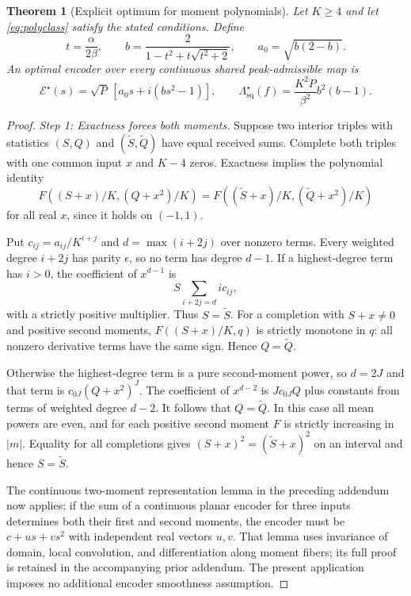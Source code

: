 \documentclass[11pt,letterpaper]{article}
\newtheorem{theorem}{Theorem}
\theoremstyle{remark}
\newcommand{\enc}{\mathscr E}
\newcommand{\sq}{\mathrm{sq}}
\begin{document}
\begin{theorem}[Explicit optimum for moment polynomials]
\label{thm:polynomial}
Let $K\ge4$ and let \eqref{eq:polyclass} satisfy the stated conditions. Define
$$
 t=\frac{\alpha}{2\beta},\qquad
 b=\frac{2}{1-t^2+t\sqrt{t^2+2}},\qquad a_0=\sqrt{b(2-b)}.
$$
An optimal encoder over every continuous shared peak-admissible map is
\begin{equation}
 \boxed{\enc^\star(s)=\sqrt P\,[a_0s+i(bs^2-1)]},\qquad
 \boxed{\Lambda_{\sq}^\star(f)=\frac{K^2P}{\beta^2}b^2(b-1)}.
 \label{eq:polyopt}
\end{equation}
\end{theorem}
\begin{proof}
\emph{Step 1: Exactness forces both moments.}
Suppose two interior triples with statistics $(S,Q)$ and $(\widetilde S,\widetilde Q)$ have equal received sums. Complete both triples with one common input $x$ and $K-4$ zeros. Exactness implies the polynomial identity
$$
 F((S+x)/K,(Q+x^2)/K)
 =F((\widetilde S+x)/K,(\widetilde Q+x^2)/K)
$$
for all real $x$, since it holds on $(-1,1)$.

Put $c_{ij}=a_{ij}/K^{i+j}$ and $d=\max(i+2j)$ over nonzero terms. Every weighted degree $i+2j$ has parity $\epsilon$, so no term has degree $d-1$. If a highest-degree term has $i>0$, the coefficient of $x^{d-1}$ is
$$
 S\sum_{i+2j=d}i c_{ij},
$$
with a strictly positive multiplier. Thus $S=\widetilde S$. For a completion with $S+x\ne0$ and positive second moments, $F((S+x)/K,q)$ is strictly monotone in $q$: all nonzero derivative terms have the same sign. Hence $Q=\widetilde Q$.

Otherwise the highest-degree term is a pure second-moment power, so $d=2J$ and that term is $c_{0J}(Q+x^2)^J$. The coefficient of $x^{d-2}$ is $Jc_{0J}Q$ plus constants from terms of weighted degree $d-2$. It follows that $Q=\widetilde Q$. In this case all mean powers are even, and for each positive second moment $F$ is strictly increasing in $|m|$. Equality for all completions gives $(S+x)^2=(\widetilde S+x)^2$ on an interval and hence $S=\widetilde S$.

The continuous two-moment representation lemma in the preceding addendum now applies: if the sum of a continuous planar encoder for three inputs determines both their first and second moments, the encoder must be $c+us+vs^2$ with independent real vectors $u,v$. That lemma uses invariance of domain, local convolution, and differentiation along moment fibers; its full proof is retained in the accompanying prior addendum. The present application imposes no additional encoder smoothness assumption.


\end{proof}
\end{document}
